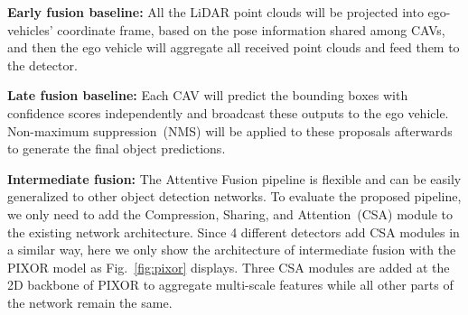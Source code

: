 \documentclass[letterpaper, 10 pt, conference]{ieeeconf}
\begin{document}
\noindent\textbf{Early fusion baseline: }All the LiDAR point clouds will be projected into ego-vehicles' coordinate frame, based on the pose information shared among CAVs, and then the ego vehicle will aggregate all received point clouds and feed them to the detector.

\noindent\textbf{Late fusion baseline: } Each CAV will predict the bounding boxes with confidence scores independently and broadcast these outputs to the ego vehicle. Non-maximum suppression~(NMS) will be applied to these proposals afterwards to generate the final object predictions.

\noindent\textbf{Intermediate fusion: }The Attentive Fusion pipeline is flexible and can be easily generalized to other object detection networks. To evaluate the proposed pipeline, we only need to add the Compression, Sharing, and Attention~(CSA) module to the existing network architecture. Since 4 different detectors add CSA modules in a similar way, here we only show the architecture of intermediate fusion with the PIXOR model as Fig.~\ref{fig:pixor} displays.  Three CSA modules are added at the 2D backbone of PIXOR to aggregate multi-scale features while all other parts of the network remain the same. 
\end{document}
